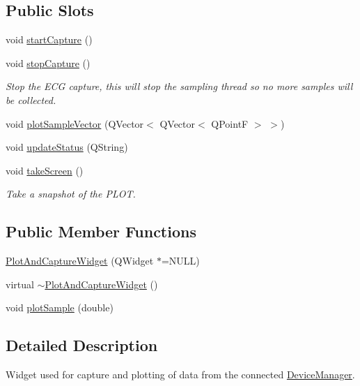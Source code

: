 \subsection*{Public Slots}
\begin{DoxyCompactItemize}
\item 
void \hyperlink{classPlotAndCaptureWidget_a232d01f00a25365382f094ad8eedb7fa}{start\+Capture} ()
\item 
void \hyperlink{classPlotAndCaptureWidget_a5f9fe948c3683ae9026a8f792782e67e}{stop\+Capture} ()
\begin{DoxyCompactList}\small\item\em Stop the E\+CG capture, this will stop the sampling thread so no more samples will be collected. \end{DoxyCompactList}\item 
void \hyperlink{classPlotAndCaptureWidget_a7dca31208a65906f0a96bf4143e0da4f}{plot\+Sample\+Vector} (Q\+Vector$<$ Q\+Vector$<$ Q\+PointF $>$ $>$)
\item 
void \hyperlink{classPlotAndCaptureWidget_a769ecd243154ae9c4ecae9bd4fcbccdb}{update\+Status} (Q\+String)
\item 
void \hyperlink{classPlotAndCaptureWidget_a77ecf5a130215ce0246b8817e44081f7}{take\+Screen} ()
\begin{DoxyCompactList}\small\item\em Take a snapshot of the P\+L\+OT. \end{DoxyCompactList}\end{DoxyCompactItemize}
\subsection*{Public Member Functions}
\begin{DoxyCompactItemize}
\item 
\hyperlink{classPlotAndCaptureWidget_a12b93ad83cddd745f19c4745a9aa7af9}{Plot\+And\+Capture\+Widget} (Q\+Widget $\ast$=N\+U\+LL)
\item 
virtual \hyperlink{classPlotAndCaptureWidget_a04d11f3f4d553c39b0d99da1a9ec0a11}{$\sim$\+Plot\+And\+Capture\+Widget} ()
\item 
void \hyperlink{classPlotAndCaptureWidget_aeb21bda06882afc4636a311318166202}{plot\+Sample} (double)
\end{DoxyCompactItemize}


\subsection{Detailed Description}
Widget used for capture and plotting of data from the connected \hyperlink{classDeviceManager}{Device\+Manager}. 

